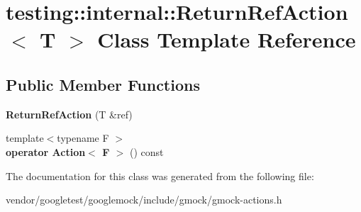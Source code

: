 \hypertarget{classtesting_1_1internal_1_1ReturnRefAction}{}\section{testing\+:\+:internal\+:\+:Return\+Ref\+Action$<$ T $>$ Class Template Reference}
\label{classtesting_1_1internal_1_1ReturnRefAction}
\subsection*{Public Member Functions}
\begin{DoxyCompactItemize}
\item 
{\bfseries Return\+Ref\+Action} (T \&ref)\hypertarget{classtesting_1_1internal_1_1ReturnRefAction_a1384b1cd78f3069f0493e2302f143701}{}\label{classtesting_1_1internal_1_1ReturnRefAction_a1384b1cd78f3069f0493e2302f143701}

\item 
{\footnotesize template$<$typename F $>$ }\\{\bfseries operator Action$<$ F $>$} () const \hypertarget{classtesting_1_1internal_1_1ReturnRefAction_a7b0df67b47a9e973fd80f7e2f90ba1bc}{}\label{classtesting_1_1internal_1_1ReturnRefAction_a7b0df67b47a9e973fd80f7e2f90ba1bc}

\end{DoxyCompactItemize}


The documentation for this class was generated from the following file\+:\begin{DoxyCompactItemize}
\item 
vendor/googletest/googlemock/include/gmock/gmock-\/actions.\+h\end{DoxyCompactItemize}
